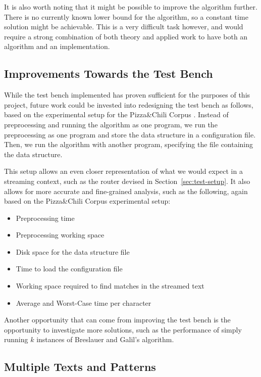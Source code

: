 \documentclass[ %
                    author={Dominic Joseph Moylett},
                    degree={MEng},
                     title={Dictionary Matching with Fingerprints},
                  subtitle={An Empirical Analysis},
                      type={research},
                      year={2015} ]{dissertation}
\begin{document}
It is also worth noting that it might be possible to improve the algorithm further. There is no currently known lower bound for the algorithm, so a constant time solution might be achievable. This is a very difficult task however, and would require a strong combination of both theory and applied work to have both an algorithm and an implementation.

\subsection{Improvements Towards the Test Bench}

While the test bench implemented has proven sufficient for the purposes of this project, future work could be invested into redesigning the test bench as follows, based on the experimental setup for the Pizza\&Chili Corpus \cite{website:pizza-setup}. Instead of preprocessing and running the algorithm as one program, we run the preprocessing as one program and store the data structure in a configuration file. Then, we run the algorithm with another program, specifying the file containing the data structure.

This setup allows an even closer representation of what we would expect in a streaming context, such as the router devised in Section~\ref{sec:test-setup}. It also allows for more accurate and fine-grained analysis, such as the following, again based on the Pizza\&Chili Corpus experimental setup:

\begin{itemize}
  \item Preprocessing time
  \item Preprocessing working space
  \item Disk space for the data structure file
  \item Time to load the configuration file
  \item Working space required to find matches in the streamed text
  \item Average and Worst-Case time per character
\end{itemize}

Another opportunity that can come from improving the test bench is the opportunity to investigate more solutions, such as the performance of simply running $k$ instances of Breslauer and Galil's algorithm.

\subsection{Multiple Texts and Patterns}
\end{document}
